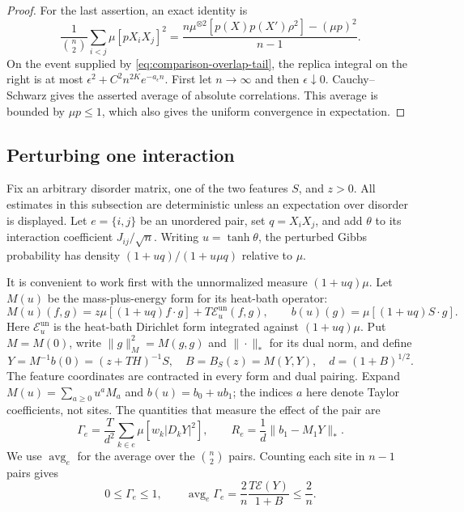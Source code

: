 \begin{proof}
For the last assertion, an exact identity is
\begin{equation}\label{eq:comparison-weighted-overlap}
 \frac1{\binom n2}\sum_{i<j}\mu[pX_iX_j]^2
 =\frac{n\mu^{\otimes2}[p(X)p(X')\rho^2]-(\mu p)^2}{n-1}.
\end{equation}
On the event supplied by \eqref{eq:comparison-overlap-tail}, the replica
integral on the right is at most
$\epsilon^2+C^2n^{2K}e^{-a_\epsilon n}$.  First let $n\to\infty$ and then
$\epsilon\downarrow0$.  Cauchy--Schwarz gives the asserted average of
absolute correlations.  This average is bounded by $\mu p\le1$, which also
gives the uniform convergence in expectation.
\end{proof}

\subsection{Perturbing one interaction}

Fix an arbitrary disorder matrix, one of the two features $S$, and $z>0$.
All estimates in this subsection are deterministic unless an expectation
over disorder is displayed.  Let $e=\{i,j\}$ be an unordered pair, set
$q=X_iX_j$, and add $\theta$ to its interaction coefficient $J_{ij}/\sqrt n$.
Writing $u=\tanh\theta$, the perturbed Gibbs probability has density
$(1+uq)/(1+u\mu q)$ relative to $\mu$.

It is convenient to work first with the unnormalized measure
$(1+uq)\mu$.  Let $M(u)$ be the mass-plus-energy form for its heat-bath
operator:
\[
 M(u)(f,g)=z\mu[(1+uq)f\cdot g]
          +T\mathcal E_u^{\mathrm{un}}(f,g),
 \qquad b(u)(g)=\mu[(1+uq)S\cdot g].
\]
Here $\mathcal E_u^{\mathrm{un}}$ is the heat-bath Dirichlet form integrated
against $(1+uq)\mu$.  Put $M=M(0)$, write
$\|g\|_M^2=M(g,g)$ and $\|\cdot\|_*$ for its dual norm, and define
\[
 Y=M^{-1}b(0)=(z+TH)^{-1}S,\quad
 B=B_S(z)=M(Y,Y),\quad d=(1+B)^{1/2}.
\]
The feature coordinates are contracted in every form and dual pairing.
Expand $M(u)=\sum_{a\ge0}u^aM_a$ and $b(u)=b_0+ub_1$; the indices $a$
here denote Taylor coefficients, not sites.  The quantities that measure the
effect of the pair are
\begin{equation}\label{eq:comparison-sensitivities}
 \Gamma_e=\frac{T}{d^2}\sum_{k\in e}\mu[w_k|D_kY|^2],\qquad
 R_e=\frac1d\|b_1-M_1Y\|_*.
\end{equation}
We use $\operatorname{avg}_e$ for the average over the $\binom n2$ pairs.
Counting each site in $n-1$ pairs gives
\begin{equation}\label{eq:comparison-energy-average}
 0\le\Gamma_e\le1,\qquad
 \operatorname{avg}_e\Gamma_e
 =\frac2n\frac{T\mathcal E(Y)}{1+B}\le\frac2n.
\end{equation}

